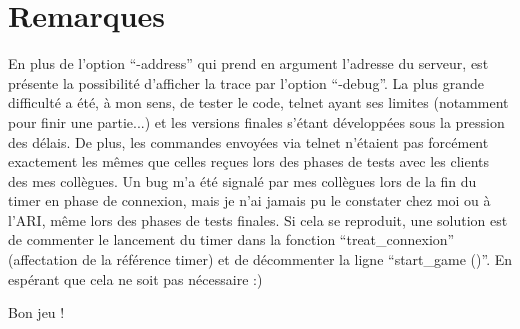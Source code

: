 \documentclass[a4paper, 11pt]{report}
\begin{document}
\section{Remarques}

En plus de l'option ``-address'' qui prend en argument l'adresse du serveur, est présente la possibilité d'afficher la trace par l'option ``-debug''.
\medskip
La plus grande difficulté a été, à mon sens, de tester le code, telnet ayant ses limites (notamment pour finir une partie...) et les versions finales s'étant développées sous la pression des délais. De plus, les commandes envoyées via telnet n'étaient pas forcément exactement les mêmes que celles reçues lors des phases de tests avec les clients des mes collègues.
\medskip
Un bug m'a été signalé par mes collègues lors de la fin du timer en phase de connexion, mais je n'ai jamais pu le constater chez moi ou à l'ARI, même lors des phases de tests finales. Si cela se reproduit, une solution est de commenter le lancement du timer dans la fonction ``treat\_connexion'' (affectation de la référence timer) et de décommenter la ligne ``start\_game ()''. En espérant que cela ne soit pas nécessaire :)
\bigskip

Bon jeu !
\end{document}

